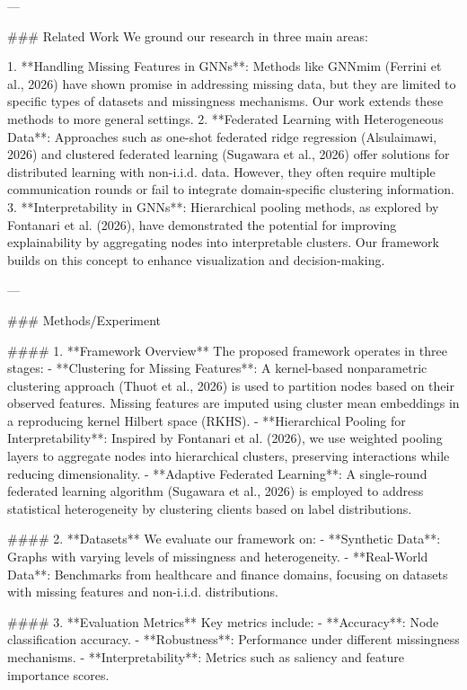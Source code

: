 ---

### Related Work  
We ground our research in three main areas:

1. **Handling Missing Features in GNNs**: Methods like GNNmim (Ferrini et al., 2026) have shown promise in addressing missing data, but they are limited to specific types of datasets and missingness mechanisms. Our work extends these methods to more general settings.
2. **Federated Learning with Heterogeneous Data**: Approaches such as one-shot federated ridge regression (Alsulaimawi, 2026) and clustered federated learning (Sugawara et al., 2026) offer solutions for distributed learning with non-i.i.d. data. However, they often require multiple communication rounds or fail to integrate domain-specific clustering information.
3. **Interpretability in GNNs**: Hierarchical pooling methods, as explored by Fontanari et al. (2026), have demonstrated the potential for improving explainability by aggregating nodes into interpretable clusters. Our framework builds on this concept to enhance visualization and decision-making.

---

### Methods/Experiment  

#### 1. **Framework Overview**  
The proposed framework operates in three stages:
   - **Clustering for Missing Features**: A kernel-based nonparametric clustering approach (Thuot et al., 2026) is used to partition nodes based on their observed features. Missing features are imputed using cluster mean embeddings in a reproducing kernel Hilbert space (RKHS).
   - **Hierarchical Pooling for Interpretability**: Inspired by Fontanari et al. (2026), we use weighted pooling layers to aggregate nodes into hierarchical clusters, preserving interactions while reducing dimensionality.
   - **Adaptive Federated Learning**: A single-round federated learning algorithm (Sugawara et al., 2026) is employed to address statistical heterogeneity by clustering clients based on label distributions.

#### 2. **Datasets**  
We evaluate our framework on:
   - **Synthetic Data**: Graphs with varying levels of missingness and heterogeneity.
   - **Real-World Data**: Benchmarks from healthcare and finance domains, focusing on datasets with missing features and non-i.i.d. distributions.

#### 3. **Evaluation Metrics**  
Key metrics include:
   - **Accuracy**: Node classification accuracy.
   - **Robustness**: Performance under different missingness mechanisms.
   - **Interpretability**: Metrics such as saliency and feature importance scores.

